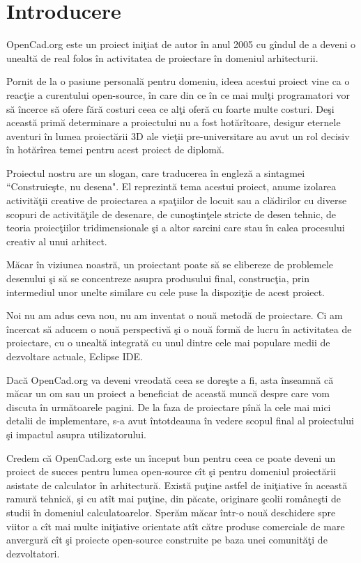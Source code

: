 \chapter{Introducere}

OpenCad.org este un proiect iniţiat de autor în anul 2005 cu gîndul de a deveni 
o unealtă de real folos în activitatea de proiectare în domeniul arhitecturii.

Pornit de la o pasiune personală pentru domeniu, ideea acestui proiect vine ca 
o reacţie a curentului open-source, în care din ce în ce mai mulţi programatori 
vor să încerce să ofere fără costuri ceea ce alţi oferă cu foarte multe 
costuri. Deşi această primă determinare a proiectului nu a fost hotărîtoare, 
desigur eternele aventuri în lumea proiectării 3D ale vieţii pre-universitare 
au avut un rol decisiv în hotărîrea temei pentru acest proiect de diplomă.

Proiectul nostru are un slogan, care traducerea în engleză a sintagmei 
``Construieşte, nu desena". El reprezintă tema acestui proiect, anume izolarea 
activităţii creative de proiectarea a spaţiilor de locuit sau a clădirilor cu 
diverse scopuri de activităţile de desenare, de cunoştinţele stricte de desen 
tehnic, de teoria proiecţiilor tridimensionale şi a altor sarcini care stau în 
calea procesului creativ al unui arhitect.

Măcar în viziunea noastră, un proiectant poate să se elibereze de problemele 
desenului şi să se concentreze asupra produsului final, construcţia, prin 
intermediul unor unelte similare cu cele puse la dispoziţie de acest proiect.

Noi nu am adus ceva nou, nu am inventat o nouă metodă de proiectare. Ci am 
încercat să aducem o nouă perspectivă şi o nouă formă de lucru în activitatea 
de proiectare, cu o unealtă integrată cu unul dintre cele mai populare medii de 
dezvoltare actuale, Eclipse IDE.

Dacă OpenCad.org va deveni vreodată ceea se doreşte a fi, asta înseamnă că 
măcar un om sau un proiect a beneficiat de această muncă despre care vom 
discuta în următoarele pagini. De la faza de proiectare pînă la cele mai mici 
detalii de implementare, s-a avut întotdeauna în vedere scopul final al 
proiectului şi impactul asupra utilizatorului.

Credem că OpenCad.org este un început bun pentru ceea ce poate deveni un 
proiect de succes pentru lumea open-source cît şi pentru domeniul proiectării 
asistate de calculator în arhitectură. Există puţine astfel de iniţiative în 
această ramură tehnică, şi cu atît mai puţine, din păcate, originare şcolii 
româneşti de studii în domeniul calculatoarelor. Sperăm măcar într-o nouă 
deschidere spre viitor a cît mai multe iniţiative orientate atît către produse 
comerciale de mare anvergură cît şi proiecte open-source construite pe baza 
unei comunităţi de dezvoltatori.

